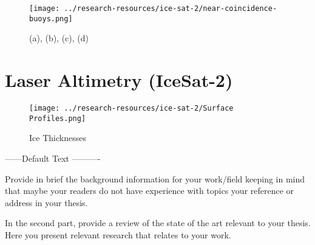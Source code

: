 \begin{figure}
    \centering
	\texttt{[image: ../research-resources/ice-sat-2/near-coincidence-buoys.png]}
    \label{near-coincidence}%
\end{figure}



\begin{figure}
    \centering
    \caption{(a), (b), (c), (d)}
    \label{gathered-sar}%
\end{figure}

\section {Laser Altimetry (IceSat-2)}



\begin{figure}[]
	\centering
	\texttt{[image: ../research-resources/ice-sat-2/Surface Profiles.png]}
	\caption{Ice Thicknesses}
	\label{fig:ice-thickness-gathered}
\end{figure}

------Default Text ----------

Provide in brief the background information for your work/field keeping in mind that maybe your readers do not have experience with topics your reference or address in your thesis. 

In the second part, provide a review of the state of the art relevant to your thesis. Here you present relevant research that relates to your work. 
